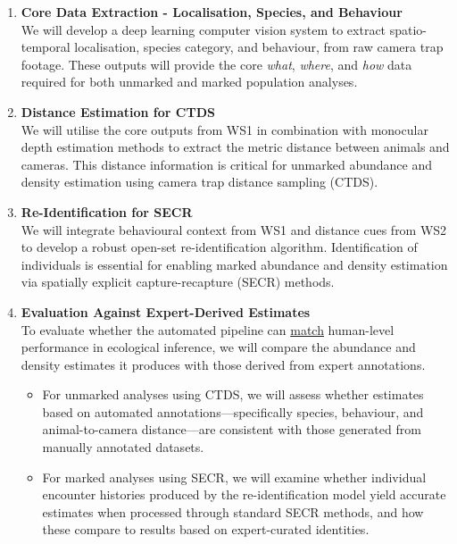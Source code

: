 \documentclass{article}
\begin{document}
\begin{enumerate}[label=\textbf{WS\arabic*:}]
      \item \textbf{Core Data Extraction - Localisation, Species, and Behaviour} \\
            We will develop a deep learning computer vision system to extract spatio-temporal localisation, species category, and behaviour, from raw camera trap footage. These outputs will provide the core \textit{what}, \textit{where}, and \textit{how} data required for both unmarked and marked population analyses.

      \item \textbf{Distance Estimation for CTDS} \\
            We will utilise the core outputs from WS1 in combination with monocular depth estimation methods to extract the metric distance between animals and cameras. This distance information is critical for unmarked abundance and density estimation using camera trap distance sampling (CTDS).

      \item \textbf{Re-Identification for SECR} \\
            We will integrate behavioural context from WS1 and distance cues from WS2 to develop a robust open-set re-identification algorithm. Identification of individuals is essential for enabling marked abundance and density estimation via spatially explicit capture-recapture (SECR) methods.

      \item \textbf{Evaluation Against Expert-Derived Estimates} \\
            To evaluate whether the automated pipeline can \underline{match} human-level performance in ecological inference, we will compare the abundance and density estimates it produces with those derived from expert annotations.

            \begin{itemize}
                  \item For unmarked analyses using CTDS, we will assess whether estimates based on automated annotations—specifically species, behaviour, and animal-to-camera distance—are consistent with those generated from manually annotated datasets.
                  \item For marked analyses using SECR, we will examine whether individual encounter histories produced by the re-identification model yield accurate estimates when processed through standard SECR methods, and how these compare to results based on expert-curated identities.
            \end{itemize}


\end{enumerate}
\end{document}
